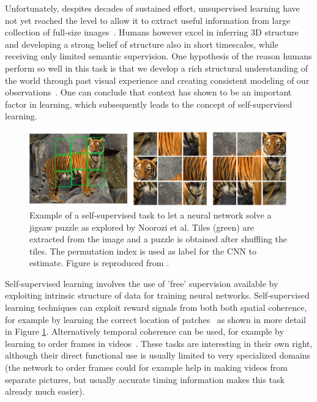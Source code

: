 Unfortunately, despites decades of sustained effort, unsupervised learning have not yet reached the level to allow it to extract useful information from large collection of full-size images~\cite{doersch2015}. Humans however excel in inferring 3D structure and developing a strong belief of structure also in short timescales, while receiving only limited semantic supervision. One hypothesis of the reason humans perform so well in this task is that we develop a rich structural understanding of the world through past visual experience and creating consistent modeling of our observations~\cite{zhou2017}. One can conclude that context has shown to be an important factor in learning, which subsequently leads to the concept of self-supervised learning.

\begin{figure}[t]
\centering
\includegraphics[width=\textwidth]{images/jigsaw_puzzle.png}
\caption{Example of a self-supervised task to let a neural network solve a jigsaw puzzle as explored by Noorozi et al\cite{noroozi2016}. Tiles (green) are extracted from the image and a puzzle is obtained after shuffling the tiles. The permutation index is used as label for the CNN to estimate. Figure is reproduced from \cite{noroozi2016}.}
\label{fig:jigsaw}
\end{figure}

Self-supervised learning involves the use of 'free' supervision available by exploiting intrinsic structure of data for training neural networks. Self-supervised learning techniques can exploit reward signals from both both spatial coherence, for example by learning the correct location of patches~\cite{doersch2015, noroozi2016} as shown in more detail in Figure \ref{fig:jigsaw}. Alternatively temporal coherence can be used, for example by learning to order frames in videos~\cite{misra2016, lee2017}. These tasks are interesting in their own right, although their direct functional use is usually limited to very specialized domains (the network to order frames could for example help in making videos from separate pictures, but usually accurate timing information makes this task already much easier).

